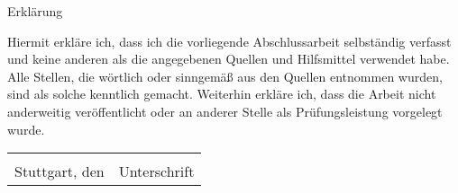 \newpage
\thispagestyle{empty}
{\Large Erklärung}

\vspace{0.5cm}
Hiermit erkläre ich, dass ich die vorliegende Abschlussarbeit selbständig verfasst und
keine anderen als die angegebenen Quellen und Hilfsmittel verwendet habe. Alle
Stellen, die wörtlich oder sinngemäß aus den Quellen entnommen wurden, sind als
solche kenntlich gemacht. Weiterhin erkläre ich, dass die Arbeit nicht anderweitig
veröffentlicht oder an anderer Stelle als Prüfungsleistung vorgelegt wurde.
\newline
\newline

\noindent
\begin{tabular}{@{}p{2.5in}p{2.5in}@{}}
  \hrulefill & \hrulefill \\
  Stuttgart, den & Unterschrift \\
\end{tabular}
